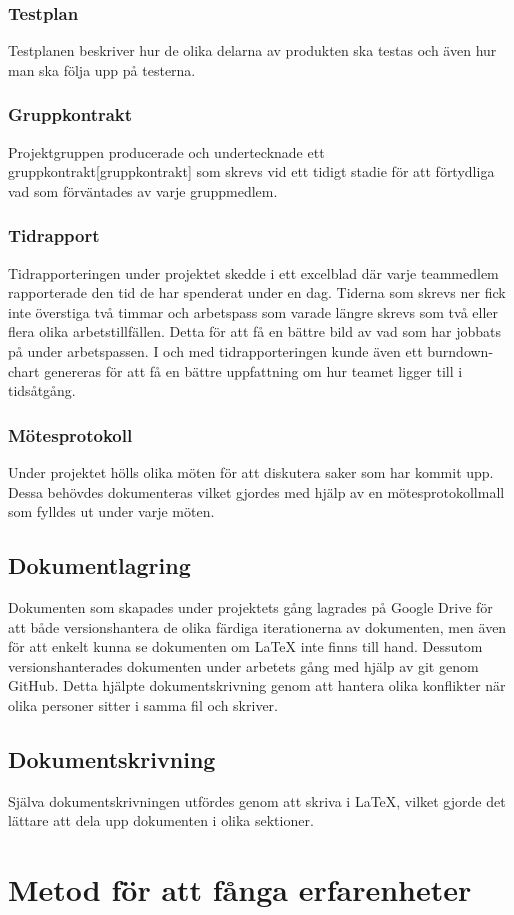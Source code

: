 \subsubsection*{Testplan}
Testplanen beskriver hur de olika delarna av produkten ska testas och även hur man ska följa upp på testerna.

\subsubsection*{Gruppkontrakt}
Projektgruppen producerade och undertecknade ett gruppkontrakt[gruppkontrakt] som skrevs vid ett tidigt stadie för att förtydliga vad som förväntades av varje gruppmedlem.

\subsubsection*{Tidrapport}
Tidrapporteringen under projektet skedde i ett excelblad där varje teammedlem rapporterade den tid de har spenderat under en dag. Tiderna som skrevs ner fick inte överstiga två timmar och arbetspass som varade längre skrevs som två eller flera olika arbetstillfällen. Detta för att få en bättre bild av vad som har jobbats på under arbetspassen. I och med tidrapporteringen kunde även ett burndown-chart genereras för att få en bättre uppfattning om hur teamet ligger till i tidsåtgång.

\subsubsection*{Mötesprotokoll}
Under projektet hölls olika möten för att diskutera saker som har kommit upp. Dessa behövdes dokumenteras vilket gjordes med hjälp av en mötesprotokollmall som fylldes ut under varje möten.

\subsection{Dokumentlagring}
Dokumenten som skapades under projektets gång lagrades på Google Drive för att både versionshantera de olika färdiga iterationerna av dokumenten, men även för att enkelt kunna se dokumenten om LaTeX inte finns till hand. Dessutom versionshanterades dokumenten under arbetets gång med hjälp av git genom GitHub. Detta hjälpte dokumentskrivning genom att hantera olika konflikter när olika personer sitter i samma fil och skriver. 

\subsection{Dokumentskrivning}
Själva dokumentskrivningen utfördes genom att skriva i LaTeX, vilket gjorde det lättare att dela upp dokumenten i olika sektioner.   

\section{Metod för att fånga erfarenheter}




